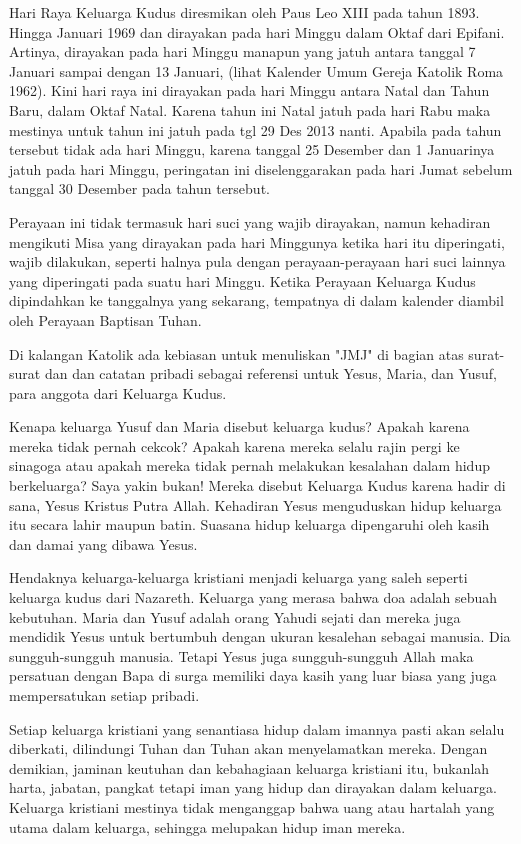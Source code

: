 \documentclass[12pt,a4paper]{article}
\begin{document}
Hari Raya Keluarga Kudus diresmikan oleh Paus Leo XIII pada tahun 1893. Hingga Januari 1969 dan dirayakan pada hari Minggu dalam Oktaf dari Epifani. Artinya, dirayakan pada hari Minggu manapun yang jatuh antara tanggal 7 Januari sampai dengan 13 Januari, (lihat Kalender Umum Gereja Katolik Roma 1962). Kini hari raya ini dirayakan pada hari Minggu antara Natal dan Tahun Baru, dalam Oktaf Natal. 
Karena tahun ini Natal jatuh pada hari Rabu maka mestinya untuk tahun ini jatuh pada tgl 29 Des 2013 nanti. 
Apabila pada tahun tersebut tidak ada hari Minggu, karena tanggal 25 Desember dan 1 Januarinya jatuh pada hari Minggu, peringatan ini diselenggarakan pada hari Jumat sebelum tanggal 30 Desember pada tahun tersebut.

Perayaan ini tidak termasuk hari suci yang wajib dirayakan, namun kehadiran mengikuti Misa yang dirayakan pada hari Minggunya ketika hari itu diperingati, wajib dilakukan, seperti halnya pula dengan perayaan-perayaan hari suci lainnya yang diperingati pada suatu hari Minggu. Ketika Perayaan Keluarga Kudus dipindahkan ke tanggalnya yang sekarang, tempatnya di dalam kalender diambil oleh Perayaan Baptisan Tuhan.

Di kalangan Katolik ada kebiasan untuk menuliskan "JMJ" di bagian atas surat-surat dan dan catatan pribadi sebagai referensi untuk Yesus, Maria, dan Yusuf, para anggota dari Keluarga Kudus.

Kenapa keluarga Yusuf dan Maria disebut keluarga kudus? Apakah karena mereka tidak pernah cekcok? Apakah karena mereka selalu rajin pergi ke sinagoga atau apakah mereka tidak pernah melakukan kesalahan dalam hidup berkeluarga? Saya yakin bukan! Mereka disebut Keluarga Kudus karena hadir di sana, Yesus Kristus Putra Allah. Kehadiran Yesus menguduskan hidup keluarga itu secara lahir maupun batin. Suasana hidup keluarga dipengaruhi oleh kasih dan damai yang dibawa Yesus.

Hendaknya keluarga-keluarga kristiani menjadi keluarga yang saleh seperti keluarga kudus dari Nazareth. Keluarga yang merasa bahwa doa adalah sebuah kebutuhan. Maria dan Yusuf adalah orang Yahudi sejati dan mereka juga mendidik Yesus untuk bertumbuh dengan ukuran kesalehan sebagai manusia. Dia sungguh-sungguh manusia. Tetapi Yesus juga sungguh-sungguh Allah maka persatuan dengan Bapa di surga memiliki daya kasih yang luar biasa yang juga mempersatukan setiap pribadi. 

Setiap keluarga kristiani yang senantiasa hidup dalam imannya pasti akan selalu diberkati, dilindungi Tuhan dan Tuhan akan menyelamatkan mereka. Dengan demikian, jaminan keutuhan dan kebahagiaan keluarga kristiani itu, bukanlah harta, jabatan, pangkat tetapi iman yang hidup dan dirayakan dalam keluarga. Keluarga kristiani mestinya tidak menganggap bahwa uang atau hartalah yang utama dalam keluarga, sehingga melupakan hidup iman mereka. 
\end{document}
